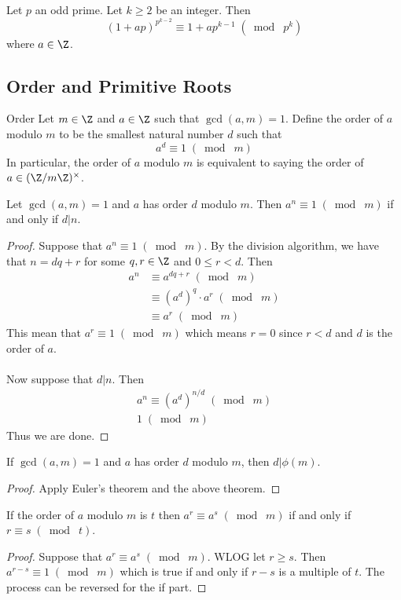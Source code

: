 \documentclass[a4paper]{article}
\begin{document}
\begin{crl}{}{} Let $p$ an odd prime. Let $k\geq 2$ be an integer. Then $$(1+ap)^{p^{k-2}}\equiv1+ap^{k-1}\;(\bmod\;p^k)$$ where $a\in\Z$. 
\end{crl}

\subsection{Order and Primitive Roots}
\begin{defn}{Order}{} Let $m\in\Z$ and $a\in\Z$ such that $\gcd(a,m)=1$. Define the order of $a$ modulo $m$ to be the smallest natural number $d$ such that $$a^d\equiv 1\;(\bmod\;m)$$ In particular, the order of $a$ modulo $m$ is equivalent to saying the order of $a\in(\Z/m\Z)^\times$. 
\end{defn}

\begin{thm}{}{} Let $\gcd(a,m)=1$ and $a$ has order $d$ modulo $m$. Then $a^n\equiv 1\;(\bmod\;m)$ if and only if $d|n$. \tcbline
\begin{proof}
Suppose that $a^n\equiv1\;(\bmod\;m)$. By the division algorithm, we have that $n=dq+r$ for some $q,r\in\Z$ and $0\leq r<d$. Then 
\begin{align*}
a^n&\equiv a^{dq+r}\;(\bmod\;m)\\
&\equiv (a^d)^q\cdot a^r\;(\bmod\;m)\\
&\equiv a^r\;(\bmod\;m)
\end{align*}
This mean that $a^r\equiv 1\;(\bmod\;m)$ which means $r=0$ since $r<d$ and $d$ is the order of $a$. \\~\\
Now suppose that $d|n$. Then
\begin{align*}
a^n\equiv (a^{d})^{n/d}\;(\bmod\;m)\\
1\;(\bmod\;m)
\end{align*}
Thus we are done. 
\end{proof}
\end{thm}

\begin{lmm}{}{} If $\gcd(a,m)=1$ and $a$ has order $d$ modulo $m$, then $d|\phi(m)$. \tcbline
\begin{proof}
Apply Euler's theorem and the above theorem. 
\end{proof}
\end{lmm}

\begin{thm}{}{} If the order of $a$ modulo $m$ is $t$ then $a^r\equiv a^s\;(\bmod\;m)$ if and only if $r\equiv s\;(\bmod\;t)$. \tcbline
\begin{proof}
Suppose that $a^r\equiv a^s\;(\bmod\;m)$. WLOG let $r\geq s$. Then $a^{r-s}\equiv 1\;(\bmod\;m)$ which is true if and only if $r-s$ is a multiple of $t$. The process can be reversed for the if part. 
\end{proof}
\end{thm}
\end{document}

